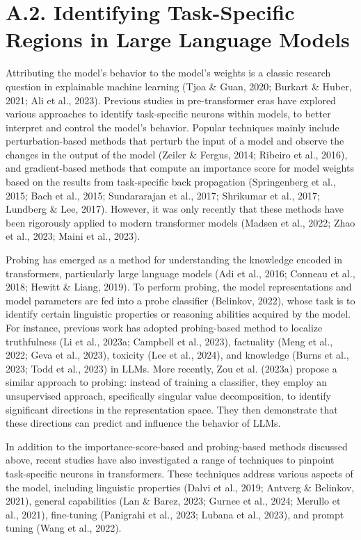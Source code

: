 \documentclass[10pt]{article}
\begin{document}
\section*{A.2. Identifying Task-Specific Regions in Large Language Models}
Attributing the model's behavior to the model's weights is a classic research question in explainable machine learning (Tjoa \& Guan, 2020; Burkart \& Huber, 2021; Ali et al., 2023). Previous studies in pre-transformer eras have explored various approaches to identify task-specific neurons within models, to better interpret and control the model's behavior. Popular techniques mainly include perturbation-based methods that perturb the input of a model and observe the changes in the output of the model (Zeiler \& Fergus, 2014; Ribeiro et al., 2016), and gradient-based methods that compute an importance score for model weights based on the results from task-specific back propagation (Springenberg et al., 2015; Bach et al., 2015; Sundararajan et al., 2017; Shrikumar et al., 2017; Lundberg \& Lee, 2017). However, it was only recently that these methods have been rigorously applied to modern transformer models (Madsen et al., 2022; Zhao et al., 2023; Maini et al., 2023).

Probing has emerged as a method for understanding the knowledge encoded in transformers, particularly large language models (Adi et al., 2016; Conneau et al., 2018; Hewitt \& Liang, 2019). To perform probing, the model representations and model parameters are fed into a probe classifier (Belinkov, 2022), whose task is to identify certain linguistic properties or reasoning abilities acquired by the model. For instance, previous work has adopted probing-based method to localize truthfulness (Li et al., 2023a; Campbell et al., 2023), factuality (Meng et al., 2022; Geva et al., 2023), toxicity (Lee et al., 2024), and knowledge (Burns et al., 2023; Todd et al., 2023) in LLMs. More recently, Zou et al. (2023a) propose a similar approach to probing: instead of training a classifier, they employ an unsupervised approach, specifically singular value decomposition, to identify significant directions in the representation space. They then demonstrate that these directions can predict and influence the behavior of LLMs.

In addition to the importance-score-based and probing-based methods discussed above, recent studies have also investigated a range of techniques to pinpoint task-specific neurons in transformers. These techniques address various aspects of the model, including linguistic properties (Dalvi et al., 2019; Antverg \& Belinkov, 2021), general capabilities (Lan \& Barez, 2023; Gurnee et al., 2024; Merullo et al., 2021), fine-tuning (Panigrahi et al., 2023; Lubana et al., 2023), and prompt tuning (Wang et al., 2022).
\end{document}
